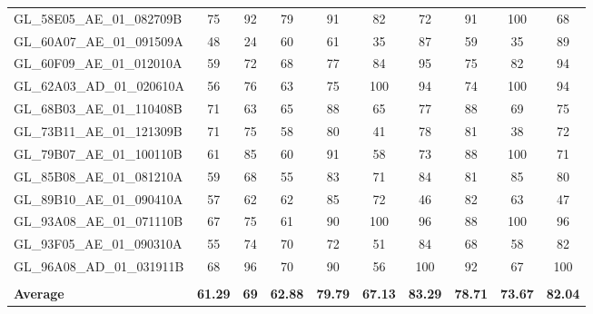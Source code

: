 \begin{adjustbox}{width=\textwidth}
\begin{tabular}{|l|ccc|ccc|ccc|}
	GL\_58E05\_AE\_01\_082709B & 75 & 92 & 79 & 91  & 82  & 72  & 91  & 100 & 68  \\
	GL\_60A07\_AE\_01\_091509A & 48 & 24 & 60 & 61  & 35  & 87  & 59  & 35  & 89  \\
	GL\_60F09\_AE\_01\_012010A & 59 & 72 & 68 & 77  & 84  & 95  & 75  & 82  & 94  \\
	GL\_62A03\_AD\_01\_020610A & 56 & 76 & 63 & 75  & 100 & 94  & 74  & 100 & 94  \\
	GL\_68B03\_AE\_01\_110408B & 71 & 63 & 65 & 88  & 65  & 77  & 88  & 69  & 75  \\
	GL\_73B11\_AE\_01\_121309B & 71 & 75 & 58 & 80  & 41  & 78  & 81  & 38  & 72  \\
	GL\_79B07\_AE\_01\_100110B & 61 & 85 & 60 & 91  & 58  & 73  & 88  & 100 & 71  \\
	GL\_85B08\_AE\_01\_081210A & 59 & 68 & 55 & 83  & 71  & 84  & 81  & 85  & 80  \\
	GL\_89B10\_AE\_01\_090410A & 57 & 62 & 62 & 85  & 72  & 46  & 82  & 63  & 47  \\
	GL\_93A08\_AE\_01\_071110B & 67 & 75 & 61 & 90  & 100 & 96  & 88  & 100 & 96  \\
	GL\_93F05\_AE\_01\_090310A & 55 & 74 & 70 & 72  & 51  & 84  & 68  & 58  & 82  \\
	GL\_96A08\_AD\_01\_031911B & 68 & 96 & 70 & 90  & 56  & 100 & 92  & 67  & 100 \\
	&    &    &    &     &     &     &     &     &     \\ \hline
	\textbf{Average} &
	\textbf{61.29} &
	\textbf{69} &
	\textbf{62.88} &
	\textbf{79.79} &
	\textbf{67.13} &
	\textbf{83.29} &
	\textbf{78.71} &
	\textbf{73.67} &
	\textbf{82.04} \\ \hline
\end{tabular}
\end{adjustbox}
